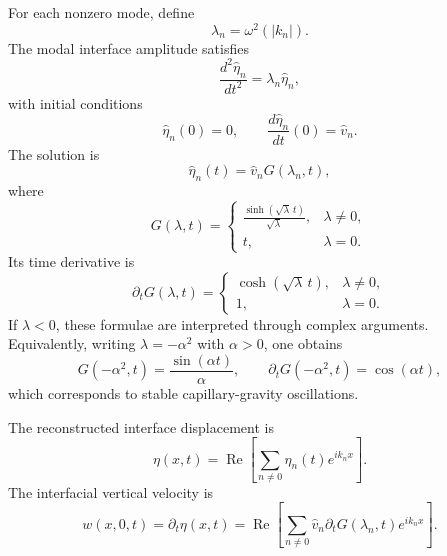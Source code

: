 \documentclass[11pt,a4paper]{article}
\begin{document}
For each nonzero mode, define
\begin{equation}
    \lambda_n = \omega^2(|k_n|).
\end{equation}
The modal interface amplitude satisfies
\begin{equation}
    \frac{d^2 \widehat{\eta}_n}{dt^2}
    =
    \lambda_n \widehat{\eta}_n,
    \label{eq:modal_ode}
\end{equation}
with initial conditions
\begin{equation}
    \widehat{\eta}_n(0)=0,
    \qquad
    \frac{d\widehat{\eta}_n}{dt}(0)=\widehat{v}_n.
\end{equation}
The solution is
\begin{equation}
    \widehat{\eta}_n(t)
    =
    \widehat{v}_n G(\lambda_n,t),
    \label{eq:eta_hat_solution}
\end{equation}
where
\begin{equation}
    G(\lambda,t)=
    \begin{cases}
    \displaystyle \frac{\sinh(\sqrt{\lambda}\,t)}{\sqrt{\lambda}}, & \lambda\neq 0,\\[1.2em]
    t, & \lambda=0.
    \end{cases}
    \label{eq:growth_kernel}
\end{equation}
Its time derivative is
\begin{equation}
    \partial_t G(\lambda,t)=
    \begin{cases}
    \cosh(\sqrt{\lambda}\,t), & \lambda\neq 0,\\[0.5em]
    1, & \lambda=0.
    \end{cases}
    \label{eq:growth_kernel_derivative}
\end{equation}
If $\lambda<0$, these formulae are interpreted through complex arguments.  Equivalently, writing $\lambda=-\alpha^2$ with $\alpha>0$, one obtains
\begin{equation}
    G(-\alpha^2,t)=\frac{\sin(\alpha t)}{\alpha},
    \qquad
    \partial_tG(-\alpha^2,t)=\cos(\alpha t),
\end{equation}
which corresponds to stable capillary-gravity oscillations.

The reconstructed interface displacement is
\begin{equation}
    \eta(x,t)
    =
    \operatorname{Re}
    \left[
    \sum_{n\neq 0}
    \widehat{\eta}_n(t)e^{i k_n x}
    \right].
    \label{eq:eta_reconstruction}
\end{equation}
The interfacial vertical velocity is
\begin{equation}
    w(x,0,t)
    =
    \partial_t\eta(x,t)
    =
    \operatorname{Re}
    \left[
    \sum_{n\neq 0}
    \widehat{v}_n\partial_tG(\lambda_n,t)e^{i k_n x}
    \right].
    \label{eq:interface_velocity}
\end{equation}
\end{document}
